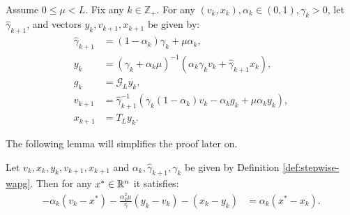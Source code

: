 \documentclass[12pt]{article}
\begin{document}
    \begin{definition}\label{def:stepwise-wapg}\;\\
        Assume $0 \le \mu < L$.
        Fix any $k \in \mathbb Z_+$. 
        For any $(v_k, x_k), \alpha_k \in (0, 1), \gamma_k > 0$, let $\hat \gamma_{k + 1}$, and vectors $y_k, v_{k + 1}, x_{k + 1}$ be given by: 
        \begin{align}
            \hat \gamma_{k + 1} &= (1 - \alpha_k)\gamma_k + \mu \alpha_k, \label{eqn:stepwise-wapg-eqn1}
            \\
            y_k &= 
            (\gamma_k + \alpha_k \mu)^{-1}(\alpha_k \gamma_k v_k + \hat\gamma_{k + 1} x_k), \label{eqn:stepwise-wapg-eqn2}
            \\
            g_k &= \mathcal G_L y_k, \label{eqn:stepwise-wapg-eqn3}
            \\
            v_{k + 1} &= \hat\gamma^{-1}_{k + 1}
            (\gamma_k(1 - \alpha_k) v_k - \alpha_k g_k + \mu \alpha_k y_k), \label{eqn:stepwise-wapg-eqn4}
            \\
            x_{k + 1} &= T_L y_k. \label{eqn:stepwise-wapg-eqn5}
        \end{align}
    \end{definition}
    The following lemma will simplifies the proof later on. 
    \begin{lemma}\label{lemma:ineq-q3}
        Let $v_k, x_k, y_k, v_{k + 1}, x_{k + 1}$ and $\alpha_k, \hat \gamma_{k + 1}, \gamma_{k}$ be given by Definition \ref{def:stepwise-wapg}. 
        Then for any $x^* \in \mathbb R^n$ it satisfies: 
        \begin{align}
            - \alpha_k(v_k - x^*) - \frac{\alpha_k^2 \mu}{\hat \gamma}(y_k - v_k) - (x_k - y_k)
            &= \alpha_k(x^* - x_k). 
            \tag{Q3}\label{eqn:Q3}
        \end{align}
    \end{lemma}
\end{document}
